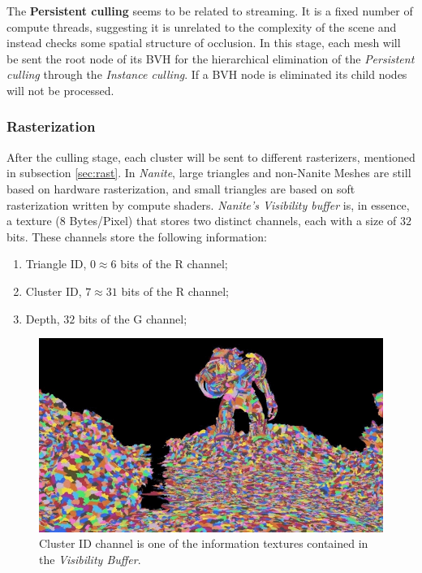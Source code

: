 \documentclass[10pt,journal,compsoc]{IEEEtran}
\begin{document}
\par The \textbf{Persistent culling} seems to be related to streaming. It is a fixed number of compute threads, suggesting it is unrelated to the complexity of the scene and instead checks some spatial structure of occlusion. In this stage, each mesh will be sent the root node of its BVH for the hierarchical elimination of the \textit{Persistent culling} through the \textit{Instance culling}. If a BVH node is eliminated its child nodes will not be processed.

\subsubsection{Rasterization}

\par After the culling stage, each cluster will be sent to different rasterizers, mentioned in subsection \ref{sec:rast}.  In \textit{Nanite}, large triangles and non-Nanite Meshes are still based on hardware rasterization, and small triangles are based on soft rasterization written by compute shaders. \textit{Nanite's Visibility buffer} is, in essence, a texture ($8$ Bytes/Pixel) that stores two distinct channels, each with a size of $32$ bits. These channels store the following information:

\begin{enumerate}
    \item Triangle ID, $0\approx6$ bits of the R channel;
    \item Cluster ID, $7\approx31$ bits of the R channel;
    \item Depth, $32$ bits of the G channel;
\end{enumerate}

\begin{figure}[H]
    \centering
    \includegraphics[scale=0.3]{img/culsterID.png}
    \caption{Cluster ID channel is one of the information textures contained in the \textit{Visibility Buffer}\cite{IGN}.}
    \label{fig:cid}
\end{figure}
\end{document}
